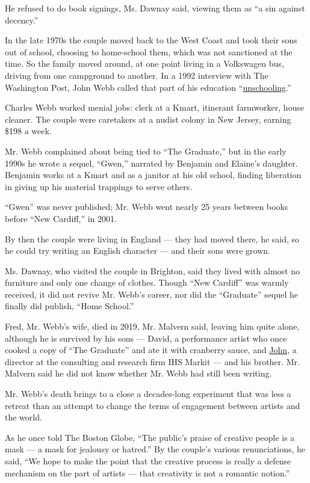 He refused to do book signings, Ms. Dawnay said, viewing them as ``a sin
against decency.''

In the late 1970s the couple moved back to the West Coast and took their
sons out of school, choosing to home-school them, which was not
sanctioned at the time. So the family moved around, at one point living
in a Volkswagen bus, driving from one campground to another. In a 1992
interview with The Washington Post, John Webb called that part of his
education
``\href{https://www.washingtonpost.com/archive/lifestyle/1992/12/20/the-dropout/b90ccd01-4bab-48b7-9801-77092aa1c943/?itid=lk_inline_manual_28}{unschooling}.''

Charles Webb worked menial jobs: clerk at a Kmart, itinerant farmworker,
house cleaner. The couple were caretakers at a nudist colony in New
Jersey, earning \$198 a week.

Mr. Webb complained about being tied to ``The Graduate,'' but in the
early 1990s he wrote a sequel, ``Gwen,'' narrated by Benjamin and
Elaine's daughter. Benjamin works at a Kmart and as a janitor at his old
school, finding liberation in giving up his material trappings to serve
others.

``Gwen'' was never published; Mr. Webb went nearly 25 years between
books before ``New Cardiff,'' in 2001.

By then the couple were living in England --- they had moved there, he
said, so he could try writing an English character --- and their sons
were grown.

Ms. Dawnay, who visited the couple in Brighton, said they lived with
almost no furniture and only one change of clothes. Though ``New
Cardiff'' was warmly received, it did not revive Mr. Webb's career, nor
did the ``Graduate'' sequel he finally did publish, ``Home School.''

Fred, Mr. Webb's wife, died in 2019, Mr. Malvern said, leaving him quite
alone, although he is survived by his sons --- David, a performance
artist who once cooked a copy of ``The Graduate'' and ate it with
cranberry sauce, and
\href{https://ihsmarkit.com/experts/webb-john.html}{John,} a director at
the consulting and research firm IHS Markit --- and his brother. Mr.
Malvern said he did not know whether Mr. Webb had still been writing.

Mr. Webb's death brings to a close a decades-long experiment that was
less a retreat than an attempt to change the terms of engagement between
artists and the world.

As he once told The Boston Globe, ``The public's praise of creative
people is a mask --- a mask for jealousy or hatred.'' By the couple's
various renunciations, he said, ``We hope to make the point that the
creative process is really a defense mechanism on the part of artists
--- that creativity is not a romantic notion.''

